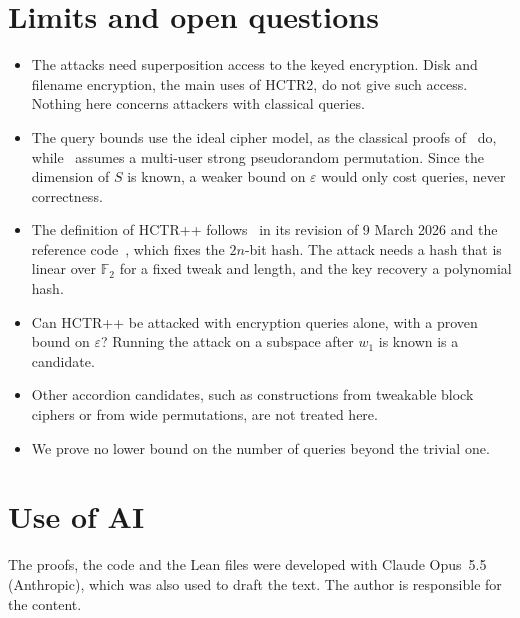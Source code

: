 \documentclass[11pt]{article}
\theoremstyle{definition}
\theoremstyle{remark}
\newcommand{\F}{\mathbb{F}}
\newcommand{\eps}{\varepsilon}
\begin{document}
\section{Limits and open questions}

\begin{itemize}
\item The attacks need superposition access to the keyed encryption. Disk and filename encryption, the main uses of HCTR2, do not give such access. Nothing here concerns attackers with classical queries.
\item The query bounds use the ideal cipher model, as the classical proofs of~\cite{OKY26} do, while~\cite{CHMNSS26} assumes a multi-user strong pseudorandom permutation. Since the dimension of $S$ is known, a weaker bound on $\eps$ would only cost queries, never correctness.
\item The definition of HCTR++ follows~\cite[Figure 4]{OKY26} in its revision of 9 March 2026 and the reference code~\cite{OKYcode}, which fixes the $2n$-bit hash. The attack needs a hash that is linear over $\F_2$ for a fixed tweak and length, and the key recovery a polynomial hash.
\item Can HCTR++ be attacked with encryption queries alone, with a proven bound on $\eps$? Running the attack on a subspace after $w_1$ is known is a candidate.
\item Other accordion candidates, such as constructions from tweakable block ciphers or from wide permutations, are not treated here.
\item We prove no lower bound on the number of queries beyond the trivial one.
\end{itemize}

\section*{Use of AI}

The proofs, the code and the Lean files were developed with Claude Opus~5.5 (Anthropic), which was also used to draft the text. The author is responsible for the content.
\end{document}

